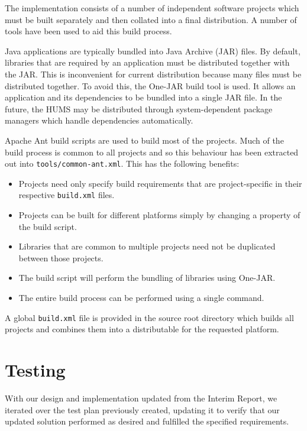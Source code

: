 \documentclass[10pt,a4paper]{article}
\begin{document}
The implementation consists of a number of independent software projects which must be built separately and then collated into a final distribution. A number of tools have been used to aid this build process. 

Java applications are typically bundled into Java Archive (JAR) files. By default, libraries that are required by an application must be distributed together with the JAR. This is inconvenient for current distribution because many files must be distributed together. To avoid this, the One-JAR build tool \cite{onejar} is used. It allows an application and its dependencies to be bundled into a single JAR file. In the future, the HUMS may be distributed through system-dependent package managers which handle dependencies automatically.

Apache Ant build scripts \cite{ant} are used to build most of the projects. Much of the build process is common to all projects and so this behaviour has been extracted out into \texttt{tools/common-ant.xml}. This has the following benefits:

\begin{itemize}
\item Projects need only specify build requirements that are project-specific in their respective \texttt{build.xml} files.
\item Projects can be built for different platforms simply by changing a property of the build script.
\item Libraries that are common to multiple projects need not be duplicated between those projects.
\item The build script will perform the bundling of libraries using One-JAR.
\item The entire build process can be performed using a single command.
\end{itemize}

A global \texttt{build.xml} file is provided in the source root directory which builds all projects and combines them into a distributable for the requested platform.

\section{Testing}
\label{sec:testing}
With our design and implementation updated from the Interim Report, we iterated over the test plan previously created, updating it to verify that our updated solution performed as desired and fulfilled the specified requirements.
\end{document}
